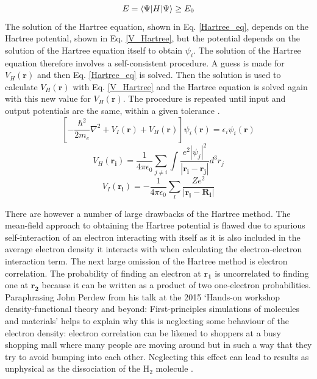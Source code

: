 \documentclass[11pt, twoside]{report}
\begin{document}
\begin{equation}\label{var_princip}
E = \braket{\Psi | H | \Psi } \geq E_0
\end{equation}
The solution of the Hartree equation, shown in Eq. \ref{Hartree_eq}, depends on the Hartree potential, shown in Eq. \ref{V_Hartree}, but the potential depends on the solution of the Hartree equation itself to obtain $\psi_i$. The solution of the Hartree equation therefore involves a self-consistent procedure. A guess is made for $V_H(\mathbf{r})$ and then Eq. \ref{Hartree_eq} is solved. Then the solution is used to calculate $V_H(\mathbf{r})$ with Eq. \ref{V_Hartree} and the Hartree equation is solved again with this new value for $V_H(\mathbf{r})$. The procedure is repeated until input and output potentials are the same, within a given tolerance \cite{Prasad_ch2}.
\begin{equation}\label{Hartree_eq}
\left[ -\frac{\hbar^2}{2m_e}\nabla^2 + V_I(\mathbf{r}) + V_H(\mathbf{r}) \right] \psi_i(\mathbf{r}) = \epsilon_i \psi_i(\mathbf{r})
\end{equation}
\begin{equation}\label{V_Hartree}
V_H(\mathbf{r_i}) = \frac{1}{4 \pi \epsilon_0} \sum_{j \neq i} \int \frac{ e^2 |\psi_j|^2}{|\mathbf{r_i} - \mathbf{r_j}|}  d^3r_j
\end{equation}
\begin{equation}\label{V_I}
V_I(\mathbf{r_i}) = -\frac{1}{4 \pi \epsilon_0} \sum_l \frac{Ze^2}{|\mathbf{r_i} - \mathbf{R_l}|}
\end{equation}

There are however a number of large drawbacks of the Hartree method. The mean-field approach to obtaining the Hartree potential is flawed due to spurious self-interaction of an electron interacting with itself as it is also included in the average electron density it interacts with when calculating the electron-electron interaction term.
The next large omission of the Hartree method is electron correlation. The probability of finding an electron at $\mathbf{r_1}$ is uncorrelated to finding one at $\mathbf{r_2}$ because it can be written as a product of two one-electron probabilities. Paraphrasing John Perdew from his talk at the 2015 `Hands-on workshop density-functional theory and beyond: First-principles simulations of molecules and materials' helps to explain why this is neglecting some behaviour of the electron density: electron correlation can be likened to shoppers at a busy shopping mall where many people are moving around but in such a way that they try to avoid bumping into each other. Neglecting this effect can lead to results as unphysical as the dissociation of the H$_2$ molecule \cite{Prasad_ch2}.
\end{document}

